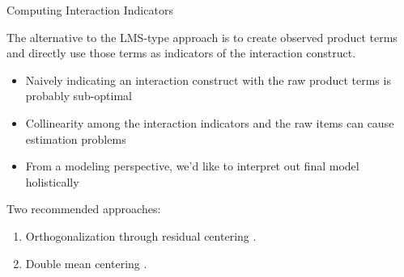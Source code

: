 \documentclass{beamer}
\newcommand{\va}[0]{\vspace{12pt}}
\newcommand{\vb}[0]{\vspace{6pt}}
\begin{document}
\begin{frame}{Computing Interaction Indicators}
  
  The alternative to the LMS-type approach is to create observed
  product terms and directly use those terms as indicators of the
  interaction construct.
  \vb
  \begin{itemize}
  \item Naively indicating an interaction construct with the raw
    product terms is probably sub-optimal
    \vb
  \item Collinearity among the interaction indicators and the raw
    items can cause estimation problems
    \vb
  \item From a modeling perspective, we'd like to interpret out final
    model holistically
  \end{itemize}
  \va
  Two recommended approaches:
  \vb
  \begin{enumerate}
  \item Orthogonalization through residual centering
    \citep{littleEtAl:2006}.
    \vb
  \item Double mean centering \citep{linEtAl:2010}.
  \end{enumerate}
  
\end{frame}
\end{document}
